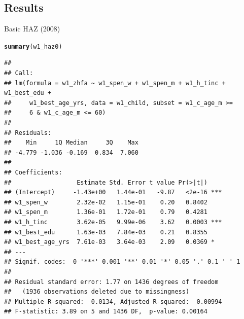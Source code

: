\documentclass[a4paper]{report}\usepackage{graphicx, color}
\makeatletter
\newcommand{\hlfunctioncall}[1]{\textcolor[rgb]{0.501960784313725,0,0.329411764705882}{\textbf{#1}}}%
\newenvironment{kframe}{%
 \def\at@end@of@kframe{}%
 \ifinner\ifhmode%
  \def\at@end@of@kframe{\end{minipage}}%
  \begin{minipage}{\columnwidth}%
 \fi\fi%
 \def\FrameCommand##1{\hskip\@totalleftmargin \hskip-\fboxsep
 \colorbox{shadecolor}{##1}\hskip-\fboxsep
     \hskip-\linewidth \hskip-\@totalleftmargin \hskip\columnwidth}%
 \MakeFramed {\advance\hsize-\width
   \@totalleftmargin\z@ \linewidth\hsize
   \@setminipage}}%
 {\par\unskip\endMakeFramed%
 \at@end@of@kframe}
\newenvironment{knitrout}{}{} %
\makeatother
\begin{document}
\begin{refsection}
\begin{knitrout}
\end{knitrout}


\section{Results}

Basic HAZ (2008)

\begin{knitrout}
\color{fgcolor}\begin{kframe}
\begin{alltt}
\hlfunctioncall{summary}(w1_haz0)
\end{alltt}
\begin{verbatim}
## 
## Call:
## lm(formula = w1_zhfa ~ w1_spen_w + w1_spen_m + w1_h_tinc + w1_best_edu + 
##     w1_best_age_yrs, data = w1_child, subset = w1_c_age_m >= 
##     6 & w1_c_age_m <= 60)
## 
## Residuals:
##    Min     1Q Median     3Q    Max 
## -4.779 -1.036 -0.169  0.834  7.060 
## 
## Coefficients:
##                  Estimate Std. Error t value Pr(>|t|)    
## (Intercept)     -1.43e+00   1.44e-01   -9.87   <2e-16 ***
## w1_spen_w        2.32e-02   1.15e-01    0.20   0.8402    
## w1_spen_m        1.36e-01   1.72e-01    0.79   0.4281    
## w1_h_tinc        3.62e-05   9.99e-06    3.62   0.0003 ***
## w1_best_edu      1.63e-03   7.84e-03    0.21   0.8355    
## w1_best_age_yrs  7.61e-03   3.64e-03    2.09   0.0369 *  
## ---
## Signif. codes:  0 '***' 0.001 '**' 0.01 '*' 0.05 '.' 0.1 ' ' 1
## 
## Residual standard error: 1.77 on 1436 degrees of freedom
##   (1936 observations deleted due to missingness)
## Multiple R-squared:  0.0134,	Adjusted R-squared:  0.00994 
## F-statistic: 3.89 on 5 and 1436 DF,  p-value: 0.00164
\end{verbatim}
\end{kframe}
\end{knitrout}



\end{refsection}
\end{document}
